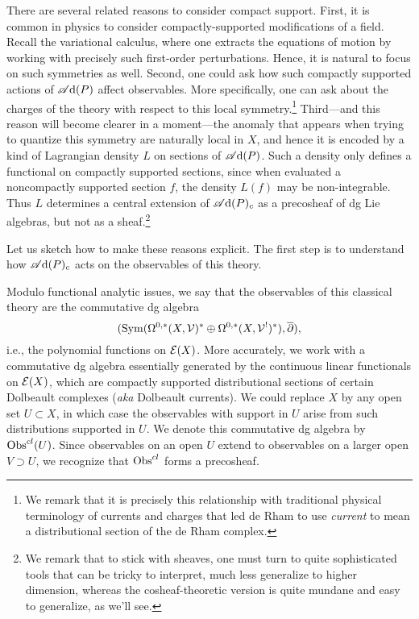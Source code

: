 There are several related reasons to consider compact support.
First, it is common in physics to consider compactly-supported modifications of a field.
Recall the variational calculus, where one extracts the equations of motion by working with precisely such first-order perturbations.
Hence, it is natural to focus on such symmetries as well.
Second, one could ask how such compactly supported actions of $\mathscr A{\rm d}(P)$ affect observables.
More specifically, one can ask about the charges of the theory with respect to this local symmetry.\footnote{We remark that it is precisely this relationship with traditional physical terminology of currents and charges that led de Rham to use {\em current} to mean a distributional section of the de Rham complex.}
Third---and this reason will become clearer in a moment---the anomaly that appears when trying to quantize this symmetry are naturally local in $X$, and hence it is encoded by a kind of Lagrangian density $L$ on sections of $\mathscr A{\rm d}(P)$.
Such a density only defines a functional on compactly supported sections,
since when evaluated a noncompactly supported section $f$, the density $L(f)$ may be non-integrable.
Thus $L$ determines a central extension of $\mathscr A{\rm d}(P)_c$ as a precosheaf of dg Lie algebras,
but not as a sheaf.\footnote{We remark that to stick with sheaves, one must turn to quite sophisticated tools \cite{WittenGr,GetzlerGM,ManBeilSch} that can be tricky to interpret, much less generalize to higher dimension, whereas the cosheaf-theoretic version is quite mundane and easy to generalize, as we'll see.}

Let us sketch how to make these reasons explicit.
The first step is to understand how $\mathscr A{\rm d}(P)_c$ acts on the observables of this theory.

Modulo functional analytic issues,
we say that the observables of this classical theory are the commutative dg algebra
\[
({\rm Sym}(\Omega^{0,*}(X,\mathcal{V})^* \oplus \Omega^{0,*}(X, \mathcal{V}^!)^*), \overline{\partial}),
\]
i.e., the polynomial functions on $\mathcal E(X)$.
More accurately, we work with a commutative dg algebra essentially generated by the continuous linear functionals on $\mathcal E(X)$, 
which are compactly supported distributional sections of certain Dolbeault complexes ({\it aka} Dolbeault currents).
We could replace $X$ by any open set $U \subset X$, 
in which case the observables with support in $U$ arise from such distributions supported in $U$.
We denote this commutative dg algebra by ${\rm Obs}^{cl}(U)$.
Since observables on an open $U$ extend to observables on a larger open $V \supset U$,
we recognize that ${\rm Obs}^{cl}$ forms a precosheaf.

